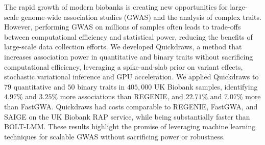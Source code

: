 The rapid growth of modern biobanks is creating new opportunities for large-scale genome-wide association studies (GWAS) and the analysis of complex traits.
%
However, performing GWAS on millions of samples often leads to trade-offs between computational efficiency and statistical power, reducing the benefits of large-scale data collection efforts.
%
We developed Quickdraws, a method that increases association power in quantitative and binary traits without sacrificing computational efficiency, leveraging a spike-and-slab prior on variant effects, stochastic variational inference and GPU acceleration.
%
We applied Quickdraws to $79$ quantitative and $50$ binary traits in $405{,}000$ UK Biobank samples, identifying $4.97\%$ and $3.25\%$ more associations than REGENIE, and $22.71\%$ and $7.07\%$ more than FastGWA.
%
Quickdraws had costs comparable to REGENIE, FastGWA, and SAIGE on the UK Biobank RAP service, while being substantially faster than BOLT-LMM.
%
These results highlight the promise of leveraging machine learning techniques for scalable GWAS without sacrificing power or robustness.
%